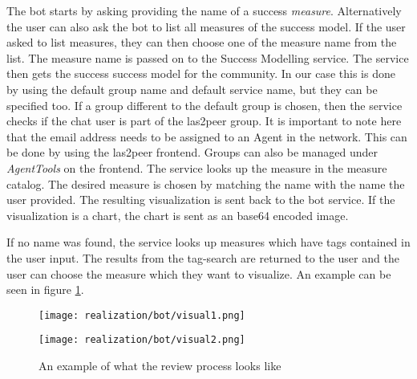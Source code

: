 The bot starts by asking providing the name of a success \emph{measure}. Alternatively the user can also ask the bot to list all measures of the success model.
If the user asked to list measures, they can then choose one of the measure name from the list. 
The measure name is passed on to the Success Modelling service. The service then gets the success success model for the community. In our case this is done by using the default group name and default service name, but they can be specified too.
If a group different to the default group is chosen, then the service checks if the chat user is part of the las2peer group. 
It is important to note here that the email address needs to be assigned to an Agent in the network. 
This can be done by using the las2peer frontend. 
Groups can also be managed under \emph{AgentTools} on the frontend.  
The service looks up the measure in the measure catalog. The desired measure is chosen by matching the name with the name the user provided. 
The resulting visualization is sent back to the bot service. If the visualization is a chart, the chart is sent as an base64 encoded image.

If no name was found, the service looks up measures which have tags contained in the user input. The results from the tag-search are returned to the user and the user can choose the measure which they want to visualize.
An example can be seen in figure \ref{fig:visualReq}.

\begin{figure}[h]
    \begin{minipage}[t]{0.5\textwidth}
        \centering
\vspace{0pt}

        \texttt{[image: realization/bot/visual1.png]} 
    \end{minipage}
    \begin{minipage}[t]{0.5\textwidth}
        \centering
\vspace{0pt}

        \texttt{[image: realization/bot/visual2.png]}
    \end{minipage}
    \caption{An example of what the review process looks like}
    \label{fig:visualReq}
\end{figure}


